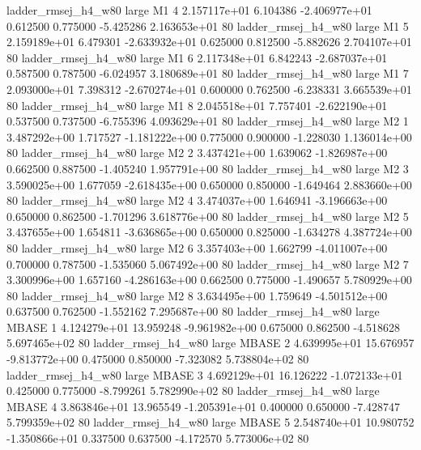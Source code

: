 ladder_rmsej_h4_w80      large       M1                 4 2.157117e+01      6.104386 -2.406977e+01 0.612500 0.775000      -5.425286 2.163653e+01 80
ladder_rmsej_h4_w80      large       M1                 5 2.159189e+01      6.479301 -2.633932e+01 0.625000 0.812500      -5.882626 2.704107e+01 80
ladder_rmsej_h4_w80      large       M1                 6 2.117348e+01      6.842243 -2.687037e+01 0.587500 0.787500      -6.024957 3.180689e+01 80
ladder_rmsej_h4_w80      large       M1                 7 2.093000e+01      7.398312 -2.670274e+01 0.600000 0.762500      -6.238331 3.665539e+01 80
ladder_rmsej_h4_w80      large       M1                 8 2.045518e+01      7.757401 -2.622190e+01 0.537500 0.737500      -6.755396 4.093629e+01 80
ladder_rmsej_h4_w80      large       M2                 1 3.487292e+00      1.717527 -1.181222e+00 0.775000 0.900000      -1.228030 1.136014e+00 80
ladder_rmsej_h4_w80      large       M2                 2 3.437421e+00      1.639062 -1.826987e+00 0.662500 0.887500      -1.405240 1.957791e+00 80
ladder_rmsej_h4_w80      large       M2                 3 3.590025e+00      1.677059 -2.618435e+00 0.650000 0.850000      -1.649464 2.883660e+00 80
ladder_rmsej_h4_w80      large       M2                 4 3.474037e+00      1.646941 -3.196663e+00 0.650000 0.862500      -1.701296 3.618776e+00 80
ladder_rmsej_h4_w80      large       M2                 5 3.437655e+00      1.654811 -3.636865e+00 0.650000 0.825000      -1.634278 4.387724e+00 80
ladder_rmsej_h4_w80      large       M2                 6 3.357403e+00      1.662799 -4.011007e+00 0.700000 0.787500      -1.535060 5.067492e+00 80
ladder_rmsej_h4_w80      large       M2                 7 3.300996e+00      1.657160 -4.286163e+00 0.662500 0.775000      -1.490657 5.780929e+00 80
ladder_rmsej_h4_w80      large       M2                 8 3.634495e+00      1.759649 -4.501512e+00 0.637500 0.762500      -1.552162 7.295687e+00 80
ladder_rmsej_h4_w80      large    MBASE                 1 4.124279e+01     13.959248 -9.961982e+00 0.675000 0.862500      -4.518628 5.697465e+02 80
ladder_rmsej_h4_w80      large    MBASE                 2 4.639995e+01     15.676957 -9.813772e+00 0.475000 0.850000      -7.323082 5.738804e+02 80
ladder_rmsej_h4_w80      large    MBASE                 3 4.692129e+01     16.126222 -1.072133e+01 0.425000 0.775000      -8.799261 5.782990e+02 80
ladder_rmsej_h4_w80      large    MBASE                 4 3.863846e+01     13.965549 -1.205391e+01 0.400000 0.650000      -7.428747 5.799359e+02 80
ladder_rmsej_h4_w80      large    MBASE                 5 2.548740e+01     10.980752 -1.350866e+01 0.337500 0.637500      -4.172570 5.773006e+02 80
